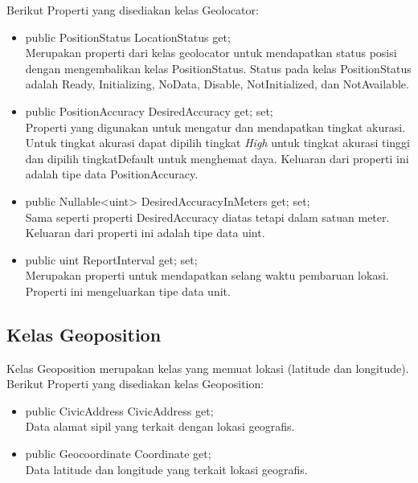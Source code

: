 Berikut Properti yang disediakan kelas Geolocator:
\begin{itemize}
	\item public PositionStatus LocationStatus { get; } \\
		Merupakan properti dari kelas geolocator untuk mendapatkan status posisi dengan mengembalikan kelas PositionStatus. Status pada kelas PositionStatus adalah Ready, Initializing, NoData, Disable, NotInitialized, dan NotAvailable.
	\item public PositionAccuracy DesiredAccuracy { get; set; } \\
		Properti yang digunakan untuk mengatur dan mendapatkan tingkat akurasi. Untuk tingkat akurasi dapat dipilih tingkat \textit{High} untuk tingkat akurasi tinggi dan dipilih tingkat{Default} untuk menghemat daya. Keluaran dari properti ini adalah tipe data PositionAccuracy.
	\item public Nullable<uint> DesiredAccuracyInMeters { get; set; }\\
		Sama seperti properti DesiredAccuracy diatas tetapi dalam satuan meter. Keluaran dari properti ini adalah tipe data uint.
	\item public uint ReportInterval { get; set; } \\
		Merupakan properti untuk mendapatkan selang waktu pembaruan lokasi. Properti ini mengeluarkan tipe data unit.
\end{itemize}

\subsection{Kelas Geoposition}
\label{subsec:Kelas Geoposition}
\hspace{0.5cm} Kelas Geoposition merupakan kelas yang memuat lokasi (latitude dan longitude).
Berikut Properti yang disediakan kelas Geoposition:
\begin{itemize}
	\item public CivicAddress CivicAddress { get; } \\
		Data alamat sipil yang terkait dengan lokasi geografis.
	\item public Geocoordinate Coordinate { get; } \\
		Data latitude dan longitude yang terkait lokasi geografis.
\end{itemize}

